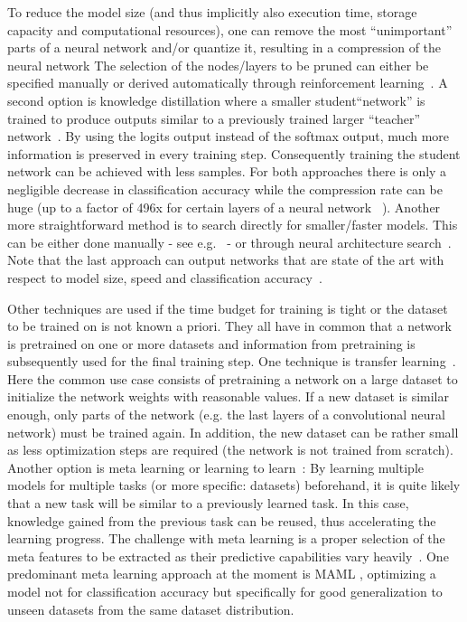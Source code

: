 \documentclass{article}
\begin{document}
To reduce the model size (and thus implicitly also execution time, storage capacity and computational resources), one can remove the most ``unimportant'' parts of a neural network and/or quantize it, resulting in a compression of the neural network The selection of the nodes/layers to be pruned can either be specified manually or derived automatically through reinforcement learning~\cite{han15,han18}. A second option is knowledge distillation where a smaller student``network'' is trained to produce outputs similar to a previously trained larger ``teacher'' network~\cite{hinton14,phuong19}. By using the logits output instead of the softmax output, much more information is preserved in every training step. Consequently training the student network can be achieved with less samples. For both approaches there is only a negligible decrease in classification accuracy while the compression rate can be huge (up to a factor of 496x for certain layers of a neural network ~\cite{reagan18}). Another more straightforward method is to search directly for smaller/faster models. This can be either done manually - see e.g.~\cite{howard17} - or through neural architecture search~\cite{elsken19}. Note that the last approach can output networks that are state of the art with respect to model size, speed and classification accuracy~\cite{tan19}.

Other techniques are used if the time budget for training is tight or the dataset to be trained on is not known a priori. They all have in common that a network is pretrained on one or more datasets and information from pretraining is subsequently used for the final training step. One technique is transfer learning~\cite{pan10}. Here the common use case consists of pretraining a network on a large dataset to initialize the network weights with reasonable values. If a new dataset is similar enough, only parts of the network (e.g. the last layers of a convolutional neural network) must be trained again. In addition, the new dataset can be rather small as less optimization steps are required (the network is not trained from scratch). Another option is meta learning or learning to learn~\cite{santoro16,hutter19}: By learning multiple models for multiple tasks (or more specific: datasets) beforehand, it is quite likely that a new task will be similar to a previously learned task. In this case, knowledge gained from the previous task can be reused, thus accelerating the learning progress. The challenge with meta learning is a proper selection of the meta features to be extracted as their predictive capabilities vary heavily~\cite{bilalli17}. One predominant meta learning approach at the moment is MAML \cite{finn17}, optimizing a model not for classification accuracy but specifically for good generalization to unseen datasets from the same dataset distribution. 
\end{document}
